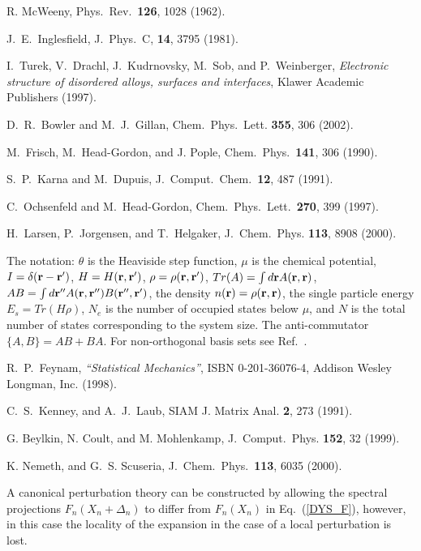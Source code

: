 \documentclass[prl,aps,twocolumn,showpacs,twocolumngrid,superbib]{revtex4}
\begin{document}
\begin{references}
 R. McWeeny, 
Phys.\ Rev.\ {\bf 126}, 1028 (1962).

 J.\ E.\ Inglesfield,
J.\ Phys.\ C, {\bf 14}, 3795 (1981).

   I.\ Turek, V.\ Drachl, J.\ Kudrnovsky, M.\ Sob, and
P.\ Weinberger, {\it Electronic structure of disordered alloys, surfaces
and interfaces}, Klawer Academic Publishers (1997). 


 D.\ R.\ Bowler and M.\ J.\ Gillan,
Chem.\ Phys.\ Lett. {\bf 355}, 306 (2002).

 M.\ Frisch, M.\ Head-Gordon, and J. Pople,
Chem.\ Phys.\ {\bf 141}, 306 (1990).

 S.\ P.\ Karna and M.\ Dupuis,
J.\ Comput.\ Chem.\ {\bf 12}, 487 (1991).

 C.\ Ochsenfeld and M.\ Head-Gordon,
Chem.\ Phys.\ Lett.\ {\bf 270}, 399 (1997).

 H.\ Larsen, P.\ Jorgensen, and T.\ Helgaker,
J.\ Chem.\ Phys. {\bf 113}, 8908 (2000).

 The notation: $\theta$ is the Heaviside step function,
$\mu$ is the chemical potential, 
$I = \delta({\bf r-r'})$, $H = H({\bf r,r'})$, $\rho = \rho({\bf r,r'})$,
$Tr(A) = \int d{\bf r} A({\bf r,r})$, $AB = \int d{\bf r''} A({\bf r,r''})B(\bf r'',r')$,
the density $n({\bf r}) = \rho({\bf r,r})$, the single particle energy $E_s = Tr(H\rho)$,
$N_e$ is the number of occupied states below $\mu$, and 
$N$ is the total number of states corresponding to the system size.
The anti-commutator $\{A,B\} = AB+BA$.
For non-orthogonal basis sets see Ref.\ \cite{Challa99}.

 R.\ P.\ Feynam, {\em ``Statistical Mechanics''},
ISBN 0-201-36076-4, Addison Wesley Longman, Inc. (1998).

 C.\ S.\ Kenney, and A.\ J.\ Laub,
SIAM J. Matrix Anal. {\bf 2}, 273 (1991).

 G. Beylkin, N. Coult, and M. Mohlenkamp,
J.\ Comput.\ Phys. {\bf 152}, 32 (1999).

 K. Nemeth, and G.\ S. Scuseria,
J.\ Chem.\ Phys.\ {\bf 113}, 6035 (2000).

 A canonical perturbation theory can be constructed
by allowing the spectral projections $F_n(X_n+\Delta_n)$ to differ
from $F_n(X_n)$ in Eq.\ (\ref{DYS_F}), however, in this case the
locality of the expansion in the case of a local perturbation is lost.


\end{references}
\end{document}
